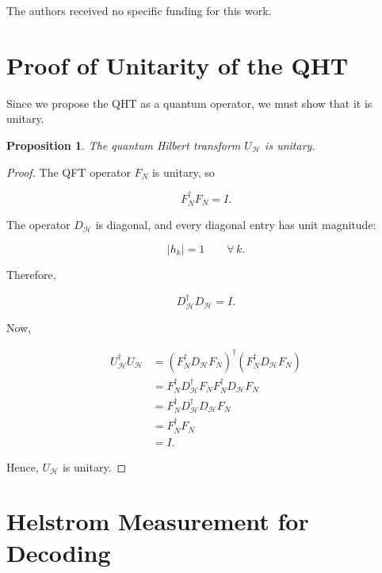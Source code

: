 \documentclass[11pt]{article}
\theoremstyle{plain}
\newtheorem{proposition}[theorem]{Proposition}
\theoremstyle{definition}
\theoremstyle{remark}
\begin{document}
The authors received no specific funding for this work.

\appendix

\section{Proof of Unitarity of the QHT}
\label{appendixA}

Since we propose the QHT as a quantum operator, we must show that it is unitary.

\begin{proposition}
The quantum Hilbert transform $U_{\mathcal H}$ is unitary.
\end{proposition}

\begin{proof}
The QFT operator $F_N$ is unitary, so

\begin{equation}
F_N^\dagger F_N=I.
\end{equation}

The operator $D_{\mathcal H}$ is diagonal, and every diagonal entry has unit magnitude:

\begin{equation}
|h_k|=1 \qquad \forall\, k. 
\end{equation}

Therefore,

\begin{equation}
D_{\mathcal H}^\dagger D_{\mathcal H}
=
I.
\end{equation}

Now,

\begin{align}
U_{\mathcal H}^\dagger U_{\mathcal H}
&=
\left(
F_N^\dagger D_{\mathcal H}F_N
\right)^\dagger
\left(
F_N^\dagger D_{\mathcal H}F_N
\right)\\
&=
F_N^\dagger
D_{\mathcal H}^\dagger
F_NF_N^\dagger
D_{\mathcal H}
F_N\\
&=
F_N^\dagger
D_{\mathcal H}^\dagger
D_{\mathcal H}
F_N\\
&=
F_N^\dagger F_N\\
&=
I.
\end{align}

Hence, $U_{\mathcal H}$ is unitary.
\end{proof}

\section{Helstrom Measurement for Decoding}
\label{app:helstrom-decoding}
\end{document}
